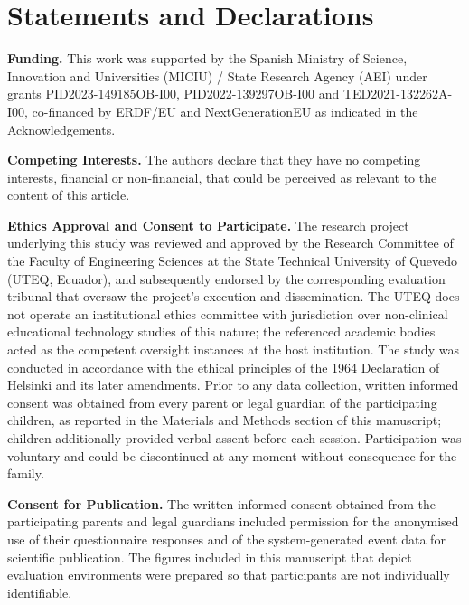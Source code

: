 
\section*{Statements and Declarations}

    \textbf{Funding.}
        This work was supported by the Spanish Ministry of Science, Innovation and Universities (MICIU) / State Research Agency (AEI) under grants PID2023-149185OB-I00, PID2022-139297OB-I00 and TED2021-132262A-I00, co-financed by ERDF/EU and NextGenerationEU as indicated in the Acknowledgements.

    \textbf{Competing Interests.}
        The authors declare that they have no competing interests, financial or non-financial, that could be perceived as relevant to the content of this article.

    \textbf{Ethics Approval and Consent to Participate.}
        The research project underlying this study was reviewed and approved by the Research Committee of the Faculty of Engineering Sciences at the State Technical University of Quevedo (UTEQ, Ecuador), and subsequently endorsed by the corresponding evaluation tribunal that oversaw the project's execution and dissemination. The UTEQ does not operate an institutional ethics committee with jurisdiction over non-clinical educational technology studies of this nature; the referenced academic bodies acted as the competent oversight instances at the host institution. The study was conducted in accordance with the ethical principles of the 1964 Declaration of Helsinki and its later amendments. Prior to any data collection, written informed consent was obtained from every parent or legal guardian of the participating children, as reported in the Materials and Methods section of this manuscript; children additionally provided verbal assent before each session. Participation was voluntary and could be discontinued at any moment without consequence for the family.

    \textbf{Consent for Publication.}
        The written informed consent obtained from the participating parents and legal guardians included permission for the anonymised use of their questionnaire responses and of the system-generated event data for scientific publication. The figures included in this manuscript that depict evaluation environments were prepared so that participants are not individually identifiable.

